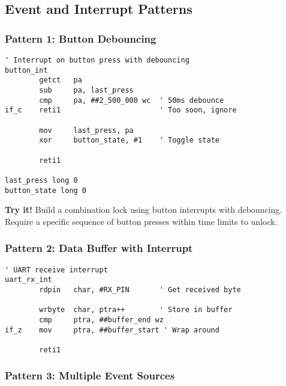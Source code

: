 \documentclass[11pt]{book}
\begin{document}
\hypertarget{event-and-interrupt-patterns}{%
\subsection{Event and Interrupt
Patterns}\label{event-and-interrupt-patterns}}

\hypertarget{pattern-1-button-debouncing}{%
\subsubsection{Pattern 1: Button
Debouncing}\label{pattern-1-button-debouncing}}

\begin{lstlisting}
' Interrupt on button press with debouncing
button_int
        getct   pa
        sub     pa, last_press
        cmp     pa, ##2_500_000 wc  ' 50ms debounce
if_c    reti1                       ' Too soon, ignore
        
        mov     last_press, pa
        xor     button_state, #1    ' Toggle state
        
        reti1

last_press long 0
button_state long 0
\end{lstlisting}

\textbf{Try it!} Build a combination lock using button interrupts with
debouncing. Require a specific sequence of button presses within time
limits to unlock.

\hypertarget{pattern-2-data-buffer-with-interrupt}{%
\subsubsection{Pattern 2: Data Buffer with
Interrupt}\label{pattern-2-data-buffer-with-interrupt}}

\begin{lstlisting}
' UART receive interrupt
uart_rx_int
        rdpin   char, #RX_PIN       ' Get received byte
        
        wrbyte  char, ptra++        ' Store in buffer
        cmp     ptra, ##buffer_end wz
if_z    mov     ptra, ##buffer_start ' Wrap around
        
        reti1
\end{lstlisting}

\hypertarget{pattern-3-multiple-event-sources}{%
\subsubsection{Pattern 3: Multiple Event
Sources}\label{pattern-3-multiple-event-sources}}
\end{document}
